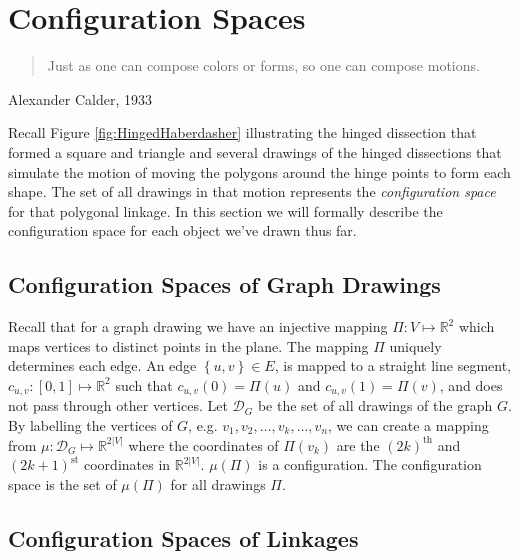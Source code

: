 \documentclass[10pt]{CSUNthesis}
\theoremstyle{plain}%
\theoremstyle{definition}
\theoremstyle{remark}
\newcommand{\DD}{{\mathcal{D}}} %
\newcommand{\bbR}{{\mathbb{R}}}
\newcommand{\curlybraces}[1]{\left\lbrace #1 \right\rbrace}
\begin{document}
\section{Configuration Spaces}
\begin{quote}
Just as one can compose colors or forms, so one can compose motions.
\end{quote}
{\raggedright{}Alexander Calder, 1933}

Recall Figure \ref{fig:HingedHaberdasher} illustrating the hinged dissection that formed a square and triangle and several drawings of the hinged dissections that simulate the motion of moving the polygons around the hinge points to form each shape.  The set of all drawings in that motion represents the \textit{configuration space} for that polygonal linkage.  In this section we will formally describe the configuration space for each object we've drawn thus far.

\subsection{Configuration Spaces of Graph Drawings}
Recall that for a graph drawing we have an injective mapping $\Pi : V \mapsto \bbR^{2}$ which maps vertices to distinct points in the plane.  
The mapping $\Pi$ uniquely determines each edge.
An edge $\curlybraces{u,v} \in E$, is mapped to a straight line segment, $c_{u,v}:[0,1]\mapsto \bbR^2$ such that $c_{u,v}(0) = \Pi(u)$ and $c_{u,v}(1) = \Pi(v)$, and does not pass through other vertices.   
Let $\DD_G$ be the set of all drawings of the graph $G$.  
By labelling the vertices of $G$, e.g. $v_1, v_2, \dots, v_k, \dots, v_{n}$, we can create a mapping from $\mu: \DD_G \mapsto \bbR^{2\vert V \vert}$ where the coordinates of $\Pi(v_k)$ are the $(2k)^\text{th}$ and $(2k+1)^\text{st}$ coordinates in $\bbR^{2\vert V \vert}$.  
$\mu(\Pi)$ is a configuration.
The configuration space is the set of $\mu(\Pi)$ for all drawings $\Pi$.  

\subsection{Configuration Spaces of Linkages}
\end{document}

